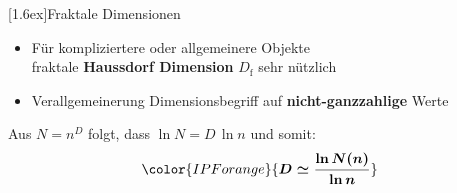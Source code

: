 \documentclass[final]{beamer}
\newlength{\columnheight}
\newlength{\marginw}
\newlength{\tw}
\newlength{\colw}
\newenvironment{myTwoColPoster}{%
  \begin{minipage}[t]{\textwidth}%
    \hspace*{\marginw}%
    \hspace*{9.5bp}%
    \begin{minipage}[t]{\tw}}%
  {\end{minipage}%
   \hspace*{\marginw}%
   \end{minipage}}
\newenvironment{myCol}%
    {\begin{minipage}[t][\columnheight][t]{\colw}}%
    {\end{minipage}}
\newenvironment{textblock}[1]%
    {\begin{block}{\rule[-0.6ex]{0pt}{2.4ex}\raisebox{-0.25ex}[1.6ex]{#1}}%
     \vspace*{5mm}}%
    {\vspace*{5mm}\end{block}}
\begin{document}
\begin{frame}[t]{}
\begin{myTwoColPoster}
\begin{myCol}
  \begin{textblock}{Fraktale Dimensionen}
    \Large
  \begin{itemize} \setlength\itemsep{1.1em} \Large
    \item F\"ur kompliziertere oder allgemeinere Objekte \\
    \hspace*{4cm}fraktale \textbf{Haussdorf Dimension} $D_\text{f}$ sehr n\"utzlich
    \item Verallgemeinerung Dimensionsbegriff auf \textcolor{IPForange}{\textbf{nicht-ganzzahlige}} Werte
  \end{itemize}
  \vspace*{1.5cm}
  Aus \textcolor{IPForange}{$N=n^D$} folgt, dass \textcolor{IPForange}{$\ln N=D\,\ln n$}  und somit:
  \begin{align*}
    \color{IPForange}{\boldsymbol{ D \simeq \frac{\ln N(n)} {\ln n}}}
  \end{align*}


\end{textblock}
\end{myCol}
\end{myTwoColPoster}
\end{frame}
\end{document}
